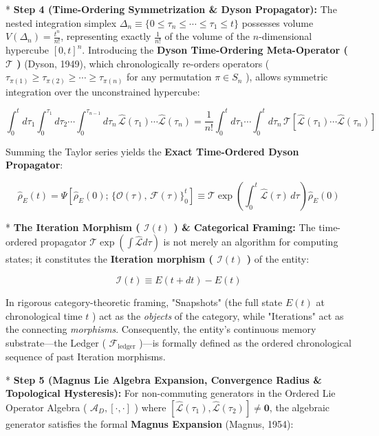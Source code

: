 \documentclass[11pt,a4paper]{article}
\theoremstyle{definition}\newtheorem{definition}{Definition}
\theoremstyle{remark}\newtheorem{remark}{Remark}
\begin{document}
* \textbf{Step 4 (Time-Ordering Symmetrization \& Dyson Propagator):}
The nested integration simplex $\Delta_n \equiv \{0 \le \tau_n \le \cdots \le \tau_1 \le t\}$ possesses volume $V(\Delta_n) = \frac{t^n}{n!}$, representing exactly $\frac{1}{n!}$ of the volume of the $n$-dimensional hypercube $[0, t]^n$. Introducing the \textbf{Dyson Time-Ordering Meta-Operator ( $\mathcal{T}$ )} (Dyson, 1949), which chronologically re-orders operators ( $\tau_{\pi(1)} \ge \tau_{\pi(2)} \ge \cdots \ge \tau_{\pi(n)}$ for any permutation $\pi \in S_n$ ), allows symmetric integration over the unconstrained hypercube:


\begin{equation}
\boxed{\int_0^t d\tau_1 \int_0^{\tau_1} d\tau_2 \cdots \int_0^{\tau_{n-1}} d\tau_n \, \hat{\mathcal{L}}(\tau_1) \cdots \hat{\mathcal{L}}(\tau_n) = \frac{1}{n!} \int_0^t d\tau_1 \cdots \int_0^t d\tau_n \, \mathcal{T}[ \hat{\mathcal{L}}(\tau_1) \cdots \hat{\mathcal{L}}(\tau_n) ]}
\end{equation}


Summing the Taylor series yields the \textbf{Exact Time-Ordered Dyson Propagator}:


\begin{equation}
\boxed{\hat{\rho}_E(t) = \Psi[\hat{\rho}_E(0);\, \{\mathcal{O}(\tau),\, \mathcal{F}(\tau)\}_{0}^{t}] \equiv \mathcal{T} \exp \left( \int_0^t \hat{\mathcal{L}}(\tau) \, d\tau \right) \hat{\rho}_E(0)}
\end{equation}


* \textbf{The Iteration Morphism ( $\mathcal{I}(t)$ ) \& Categorical Framing:}
The time-ordered propagator $\mathcal{T} \exp(\int \hat{\mathcal{L}} d\tau)$ is not merely an algorithm for computing states; it constitutes the \textbf{Iteration morphism ( $\mathcal{I}(t)$ )} of the entity:


\begin{equation}
\boxed{\mathcal{I}(t) \equiv E(t+dt) - E(t)}
\end{equation}


In rigorous category-theoretic framing, "Snapshots" (the full state $E(t)$ at chronological time $t$ ) act as the \textit{objects} of the category, while "Iterations" act as the connecting \textit{morphisms}. Consequently, the entity's continuous memory substrate—the Ledger ( $\mathcal{F}_{\text{ledger}}$ )—is formally defined as the ordered chronological sequence of past Iteration morphisms.

* \textbf{Step 5 (Magnus Lie Algebra Expansion, Convergence Radius \& Topological Hysteresis):}
For non-commuting generators in the Ordered Lie Operator Algebra ( $\mathcal{A}_D, [ \cdot, \cdot ]$ ) where $[ \hat{\mathcal{L}}(\tau_1), \hat{\mathcal{L}}(\tau_2) ] \neq \mathbf{0}$, the algebraic generator satisfies the formal \textbf{Magnus Expansion} (Magnus, 1954):
\end{document}
